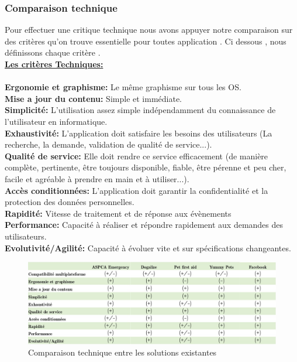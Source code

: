 \documentclass[11pt,a4paper,oneside]{book}
\begin{document}
	\subsubsection{Comparaison technique}
	Pour effectuer une critique technique nous avons appuyer notre comparaison sur des critères qu'on trouve essentielle pour toutes application . Ci dessous , nous définissons chaque critère .  \\
	\underline{\textbf{Les critères Techniques:} }\\ \\
	\textbf{Ergonomie et graphisme:} Le même graphisme sur tous les OS.\\
	\textbf{Mise a jour du contenu:} Simple et immédiate.\\
	\textbf{Simplicité:} L'utilisation assez simple indépendamment du connaissance de l'utilisateur en informatique.\\
	\textbf{Exhaustivité:} L'application doit satisfaire les besoins des utilisateurs (La recherche, la demande, validation de qualité de service...).\\
	\textbf{Qualité de service:} Elle doit rendre ce service efficacement (de manière complète, pertinente, être toujours disponible, fiable, être pérenne et peu cher, facile et agréable à prendre en main et à utiliser...).\\
	\textbf{Accès conditionnées:} L'application doit garantir la confidentialité et la protection des données personnelles.\\
	\textbf{Rapidité:} Vitesse de traitement et de réponse aux évènements\\
	\textbf{Performance:} Capacité à réaliser et répondre rapidement aux demandes des utilisateurs.\\
	\textbf{Evolutivité/Agilité:} Capacité à évoluer vite et sur spécifications changeantes.
	\begin{figure}[H]
		\centering
		\includegraphics[width=1.3\textwidth]{Images/Ch1/technique}
		\caption{Comparaison technique entre les solutions existantes}
		\label{fig:comparaison-technique}
	\end{figure}
	\vspace*{\fill}
	
\end{document}
